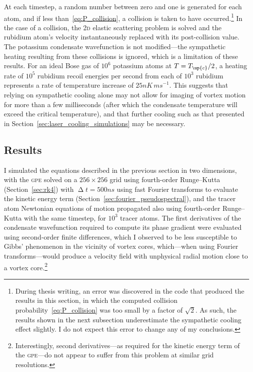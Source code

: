 At each timestep, a random number between zero and one is generated for each atom, and if less than~\eqref{eq:P_collision}, a collision is taken to have occurred.\footnote{During thesis writing, an error was discovered in the code that produced the results in this section, in which the computed collision probability~\eqref{eq:P_collision} was too small by a factor of $\sqrt{2}$. As such, the results shown in the next subsection underestimate the sympathetic cooling effect slightly. I do not expect this error to change any of my conclusions.} In the case of a collision, the \textsc{2d} elastic scattering problem is solved and the rubidium atom's velocity instantaneously replaced with its post-collision value. The potassium condensate wavefunction is not modified---the sympathetic heating resulting from these collisions is ignored, which is a limitation of these results. For an ideal Bose gas of $10^6$ potassium atoms at $T = T_\up{c}/2$, a heating rate of $10^5$ rubidium recoil energies per second from each of $10^3$ rubidium represents a rate of temperature increase of $25\unit{nK\,ms}^{-1}$. This suggests that relying on sympathetic cooling alone may not allow for imaging of vortex motion for more than a few milliseconds (after which the condensate temperature will exceed the critical temperature), and that further cooling such as that presented in Section~\ref{sec:laser_cooling_simulations} may be necessary.

\subsection{Results}

I simulated the equations described in the previous section in two dimensions, with the \textsc{gpe} solved on a $256\times256$ grid using fourth-order Runge--Kutta (Section~\ref{sec:rk4}) with $\upDelta t = 500\unit{ns}$ using fast Fourier transforms to evaluate the kinetic energy term (Section~\ref{sec:fourier_pseudospectral}), and the tracer atom Newtonian equations of motion propagated also using fourth-order Runge--Kutta with the same timestep, for $10^3$ tracer atoms. The first derivatives of the condensate wavefunction required to compute its phase gradient were evaluated using second-order finite differences, which I observed to be less susceptible to Gibbs' phenomenon in the vicinity of vortex cores, which---when using Fourier transforms---would produce a velocity field with unphysical radial motion close to a vortex core.\footnote{Interestingly, second derivatives---as required for the kinetic energy term of the \textsc{gpe}---do not appear to suffer from this problem at similar grid resolutions.}

